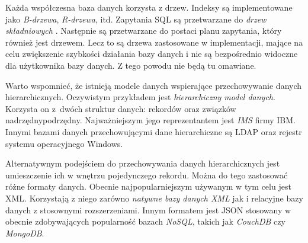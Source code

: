 Każda współczesna baza danych korzysta z drzew. 
Indeksy są implementowane jako \emph{B-drzewa}, \emph{R-drzewa}, itd.
Zapytania SQL są przetwarzane do \emph{drzew składniowych} . Następnie są przetwarzane do postaci planu zapytania, który również jest drzewem.
Lecz to są drzewa zastosowane w implementacji, mające na celu zwiększenie szybkości działania bazy danych i nie są bezpośrednio widoczne dla użytkownika bazy danych.
Z tego powodu nie będą tu omawiane.

Warto wspomnieć, że istnieją modele danych wspierające przechowywanie danych hierarchicznych.
Oczywistym przykładem jest \emph{hierarchiczny model danych}.
Korzysta on z~dwóch struktur danych: rekordów oraz związków nadrzędny\dywiz{}podrzędny.
Najważniejszym jego reprezentantem jest \emph{IMS}  firmy IBM.
Innymi bazami danych przechowującymi dane hierarchiczne są LDAP  oraz rejestr systemu operacyjnego Windows.

Alternatywnym podejściem do przechowywania danych hierarchicznych jest umieszczenie ich w wnętrzu pojedynczego rekordu.
Można do tego zastosować różne formaty danych.
Obecnie najpopularniejszym używanym w tym celu jest XML.
Korzystają z niego zarówno \emph{natywne bazy danych XML}  jak i relacyjne bazy danych z stosownymi rozszerzeniami.
Innym formatem jest JSON stosowany w obecnie zdobywających popularność bazach \emph{NoSQL}, takich jak \emph{CouchDB} czy \emph{MongoDB}. 






%












